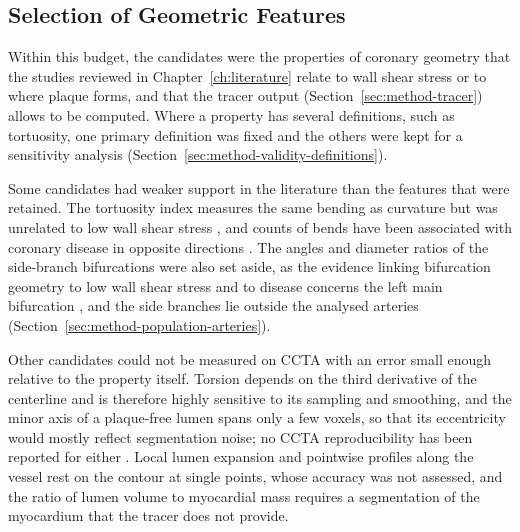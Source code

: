 
\subsection{Selection of Geometric Features}
\label{sec:method-selection}

Within this budget, the candidates were the properties of coronary geometry that the studies reviewed in Chapter~\ref{ch:literature} relate to wall shear stress or to where plaque forms, and that the tracer output (Section~\ref{sec:method-tracer}) allows to be computed.
Where a property has several definitions, such as tortuosity, one primary definition was fixed and the others were kept for a sensitivity analysis (Section~\ref{sec:method-validity-definitions}).

Some candidates had weaker support in the literature than the features that were retained.
The tortuosity index measures the same bending as curvature but was unrelated to low wall shear stress \cite{kashyap2022tortuosity}, and counts of bends have been associated with coronary disease in opposite directions \cite{groves2009tortuosity,li2011tortuosity,telloayala2026tortuosity}.
The angles and diameter ratios of the side-branch bifurcations were also set aside, as the evidence linking bifurcation geometry to low wall shear stress and to disease concerns the left main bifurcation \cite{cui2017bifurcation,garcha2025sensitivity,tommasino2024clap}, and the side branches lie outside the analysed arteries (Section~\ref{sec:method-population-arteries}).

Other candidates could not be measured on CCTA with an error small enough relative to the property itself.
Torsion depends on the third derivative of the centerline and is therefore highly sensitive to its sampling and smoothing, and the minor axis of a plaque-free lumen spans only a few voxels, so that its eccentricity would mostly reflect segmentation noise; no CCTA reproducibility has been reported for either .
Local lumen expansion and pointwise profiles along the vessel rest on the contour at single points, whose accuracy was not assessed, and the ratio of lumen volume to myocardial mass requires a segmentation of the myocardium that the tracer does not provide.

